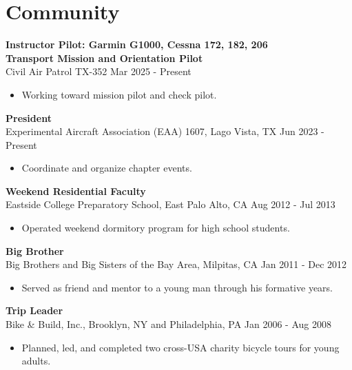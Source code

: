 \section{Community}

\textbf{Instructor Pilot: Garmin G1000, Cessna 172, 182, 206} \\
\textbf{Transport Mission and Orientation Pilot} \\
Civil Air Patrol TX-352 \hfill Mar 2025 - Present
\begin{itemize}  \itemsep -2pt %
\item Working toward mission pilot and check pilot.
\end{itemize}

\textbf{President} \\
Experimental Aircraft Association (EAA) 1607, Lago Vista, TX \hfill Jun 2023 - Present
\begin{itemize}  \itemsep -2pt %
\item Coordinate and organize chapter events.
\end{itemize}

\textbf{Weekend Residential Faculty} \\
Eastside College Preparatory School, East Palo Alto, CA \hfill Aug 2012 - Jul 2013
\begin{itemize}  \itemsep -2pt %
\item Operated weekend dormitory program for high school students.
\end{itemize}

\textbf{Big Brother} \\
Big Brothers and Big Sisters of the Bay Area, Milpitas, CA \hfill Jan 2011 - Dec 2012
\begin{itemize}  \itemsep -2pt %
\item Served as friend and mentor to a young man through his formative years.
\end{itemize}

\textbf{Trip Leader} \\
Bike \& Build, Inc., Brooklyn, NY and Philadelphia, PA \hfill Jan 2006 - Aug 2008
\begin{itemize}  \itemsep -2pt %
\item Planned, led, and completed two cross-USA charity bicycle tours for young adults.
\end{itemize}

